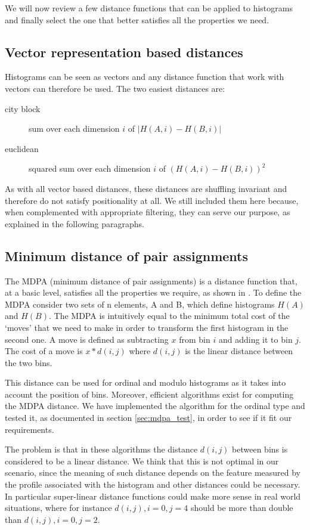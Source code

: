 We will now review a few distance functions that can be applied to histograms and finally select the one that better satisfies all the properties we need.

\subsection{Vector representation based distances}

Histograms can be seen as vectors and any distance function that work with vectors can therefore be used. The two easiest distances are:
\begin{description}
  \item[city block] sum over each dimension $i$ of $|H(A,i) - H(B,i)|$
  \item[euclidean] squared sum over each dimension $i$ of $(H(A,i) - H(B,i))^2$
\end{description}

As with all vector based distances, these distances are shuffling invariant and therefore do not satisfy positionality at all. We still included them here because, when complemented with appropriate filtering, they can serve our purpose, as explained in the following paragraphs.

\subsection{Minimum distance of pair assignments}

The MDPA (minimum distance of pair assignments) is a distance function that, at a basic level, satisfies all the properties we require, as shown in \cite{histogram}. To define the MDPA consider two sets of n elements, A and B, which define histograms $H(A)$ and $H(B)$. The MDPA is intuitively equal to the minimum total cost of the `moves' that we need to make in order to transform the first histogram in the second one. A move is defined as subtracting $x$ from bin $i$ and adding it to bin $j$. The cost of a move is $x * d(i, j)$ where $d(i, j)$ is the linear distance between the two bins.

This distance can be used for ordinal and modulo histograms as it takes into account the position of bins. Moreover, efficient algorithms exist for computing the MDPA distance. We have implemented the algorithm for the ordinal type and tested it, as documented in section \ref{sec:mdpa_test}, in order to see if it fit our requirements.

The problem is that in these algorithms the distance $d(i, j)$ between bins is considered to be a linear distance. We think that this is not optimal in our scenario, since the meaning of such distance depends on the feature measured by the profile associated with the histogram and other distances could be necessary. In particular super-linear distance functions could make more sense in real world situations, where for instance $d(i, j), i=0, j=4$ should be more than double than $d(i, j), i=0, j=2$.

